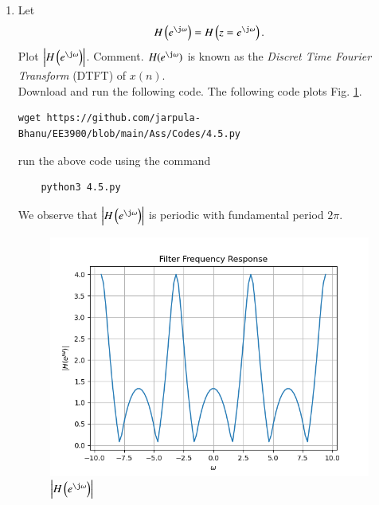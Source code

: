 \documentclass[journal,12pt,twocolumn]{IEEEtran}
\renewcommand\thesection{\arabic{section}}
\begin{document}
\begin{enumerate}[label=\thesection.\arabic*
,ref=\thesection.\theenumi]
\begin{equation}
\label{eq:anun}
a^nu(n) \ztrans \frac{1}{1-az^{-1}} \quad \abs{z} > \abs{a}
\end{equation}
\solution \begin{align}
	a^nu(n) &\ztrans \sum_{n=0}^\infty (az^{-1})^n\\
	& =\frac{1}{1-az^{-1}} \quad \abs{z} > \abs{a}
\end{align}
%
\item 
Let
\begin{equation}
H\brak{e^{\j \omega}} = H\brak{z = e^{\j \omega}}.
\end{equation}
Plot $\abs{H\brak{e^{\j \omega}}}$.  Comment.  $H(e^{\j \omega})$ is
known as the {\em Discret Time Fourier Transform} (DTFT) of $x(n)$.
\\
\solution Download and run the following code. The following code plots Fig. \ref{fig:dtft}.
\begin{lstlisting}
wget https://github.com/jarpula-Bhanu/EE3900/blob/main/Ass/Codes/4.5.py
\end{lstlisting}
run the above code using the command 
\begin{lstlisting}
	python3 4.5.py
\end{lstlisting}
We observe that $\abs{H\brak{e^{\j \omega}}}$ is periodic with fundamental period $2\pi$.
\begin{figure}[!ht]
\centering
\includegraphics[width=\columnwidth]{./figs/4.5.png}
\caption{$\abs{H\brak{e^{\j\omega}}}$}
\label{fig:dtft}
\end{figure}


\end{enumerate}
\end{document}
